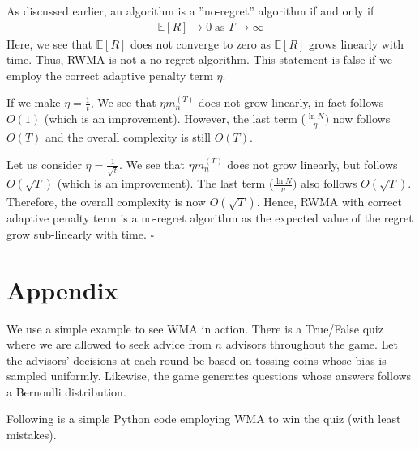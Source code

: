 \documentclass[11pt]{article}
\newcommand*{\QED}{\hfill\ensuremath{\square}}
\begin{document}
As discussed earlier, an algorithm is a ”no-regret” algorithm if and only if 
\begin{align}
    \mathbb{E}[R] \rightarrow 0 \;
    \text{as} \; T \rightarrow \infty
\end{align}
Here, we see that $\mathbb{E}[R]
$ does not converge to zero as $\mathbb{E}[R]$ grows linearly with time. Thus, RWMA is not a no-regret algorithm. This statement is false if we employ the correct adaptive penalty term $\eta$.

If we make $\eta = \frac{1}{t}$, We see that $\eta m_n^{(T)}$ does not grow linearly, in fact follows $O(1)$ (which is an improvement). However, the last term ($ \frac{\ln N}{\eta})$ now follows $O(T)$ and the overall complexity is still $O(T)$.

Let us consider $\eta = \frac{1}{\sqrt{t}}$. We see that $\eta m_n^{(T)}$ does not grow linearly, but follows $O(\sqrt{T})$ (which is an improvement). The last term ($ \frac{\ln N}{\eta})$ also follows $O(\sqrt{T})$. Therefore, the overall complexity is now $O(\sqrt{T})$. Hence, RWMA with correct adaptive penalty term is a no-regret algorithm as the expected value of the regret grow sub-linearly with time. \QED

\section{Appendix}

We use a simple example to see WMA in action. There is a True/False quiz where we are allowed to seek advice from $n$ advisors throughout the game. Let the advisors' decisions at each round be based on tossing coins whose bias is sampled uniformly. Likewise, the game generates questions whose answers follows a Bernoulli distribution. 

Following is a simple Python code \cite{code} employing WMA to win the quiz (with least mistakes). 
\end{document}
